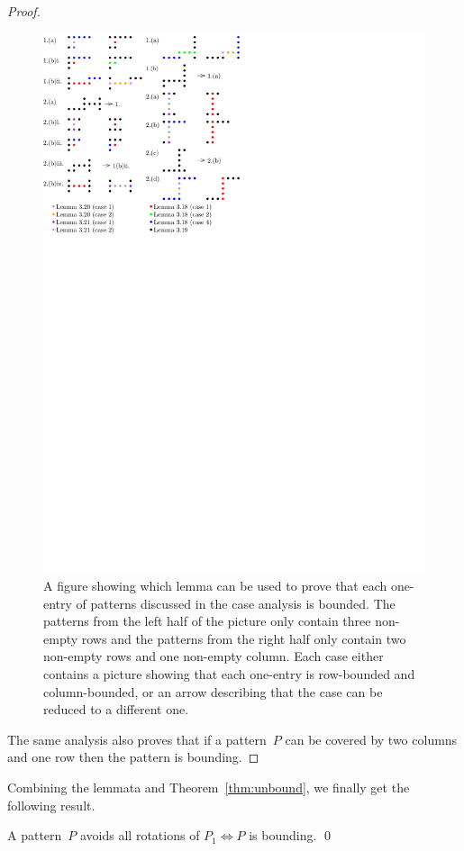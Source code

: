 \begin{proof}
\begin{figure}[!ht]
	\centering
	\includegraphics[width=120mm]{img/caseana.pdf}
	\caption{A figure showing which lemma can be used to prove that each one-entry of patterns discussed in the case analysis is bounded. The patterns from the left half of the picture only contain three non-empty rows and the patterns from the right half only contain two non-empty rows and one non-empty column. Each case either contains a picture showing that each one-entry is row-bounded and column-bounded, or an arrow describing that the case can be reduced to a different one.}
	\label{fig:pictproof1}
\end{figure}

The same analysis also proves that if a pattern~$P$ can be covered by two columns and one row then the pattern is bounding.
\end{proof}

Combining the lemmata and Theorem~\ref{thm:unbound}, we finally get the following result.

\begin{thm}
A pattern~$P$ avoids all rotations of $P_1\Leftrightarrow P$ is bounding. \qed
\end{thm}

